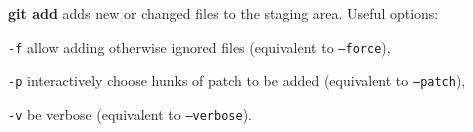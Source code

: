 %

\textbf{git add} adds new or changed files to the staging area.
Useful options:
\begin{compactenum}
\item [\texttt{-f}] allow adding otherwise ignored files (equivalent to \texttt{--force}),
\item [\texttt{-p}] interactively choose hunks of patch to be added (equivalent to \texttt{--patch}),
\item [\texttt{-v}] be verbose (equivalent to \texttt{--verbose}).
\end{compactenum}

%